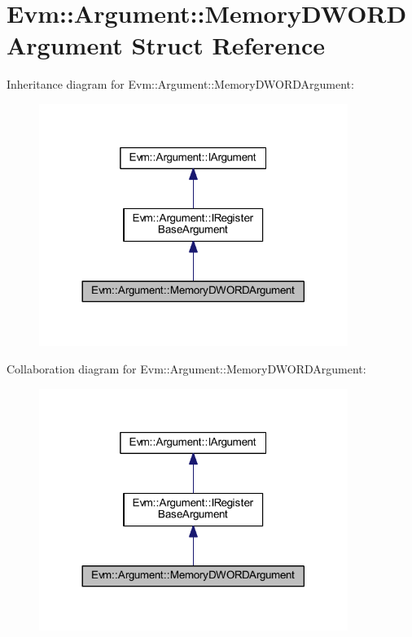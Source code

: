 \hypertarget{struct_evm_1_1_argument_1_1_memory_d_w_o_r_d_argument}{}\section{Evm\+:\+:Argument\+:\+:Memory\+D\+W\+O\+R\+D\+Argument Struct Reference}
\label{struct_evm_1_1_argument_1_1_memory_d_w_o_r_d_argument}


Inheritance diagram for Evm\+:\+:Argument\+:\+:Memory\+D\+W\+O\+R\+D\+Argument\+:
\nopagebreak
\begin{figure}[H]
\begin{center}
\leavevmode
\includegraphics[width=284pt]{struct_evm_1_1_argument_1_1_memory_d_w_o_r_d_argument__inherit__graph}
\end{center}
\end{figure}


Collaboration diagram for Evm\+:\+:Argument\+:\+:Memory\+D\+W\+O\+R\+D\+Argument\+:
\nopagebreak
\begin{figure}[H]
\begin{center}
\leavevmode
\includegraphics[width=284pt]{struct_evm_1_1_argument_1_1_memory_d_w_o_r_d_argument__coll__graph}
\end{center}
\end{figure}
